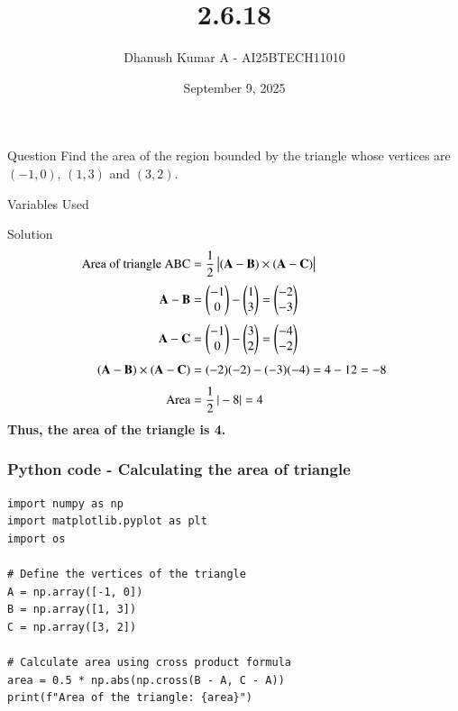 \documentclass{beamer}
\title{2.6.18}
\author{Dhanush Kumar A - AI25BTECH11010}
\date{September 9, 2025}
\begin{document}
\frame{\titlepage}

\begin{frame}{Question}
Find the area of the region bounded by the triangle whose vertices are $(-1, 0)$, $(1, 3)$ and $(3, 2)$.
\end{frame}

\begin{frame}{Variables Used}
\begin{table}[H]    
  \centering
  \caption{Variables Used}
  \label{tab:variables}
\end{table}
\end{frame}




\begin{frame}{Solution}
\begin{align}
\text{Area of triangle ABC} &= \frac{1}{2} \, \big| (\mathbf{A}-\mathbf{B}) \times (\mathbf{A}-\mathbf{C}) \big| \\[1mm]
\mathbf{A}-\mathbf{B} &= \begin{pmatrix}-1 \\ 0\end{pmatrix} - \begin{pmatrix}1 \\ 3\end{pmatrix} = \begin{pmatrix}-2 \\ -3\end{pmatrix} \\[1mm]
\mathbf{A}-\mathbf{C} &= \begin{pmatrix}-1 \\ 0\end{pmatrix} - \begin{pmatrix}3 \\ 2\end{pmatrix} = \begin{pmatrix}-4 \\ -2\end{pmatrix} \\[1mm]
(\mathbf{A}-\mathbf{B}) \times (\mathbf{A}-\mathbf{C}) &= (-2)(-2) - (-3)(-4) = 4 - 12 = -8 \\[1mm]
\text{Area} &= \frac{1}{2} \, | -8 | = 4
\end{align}
\noindent\textbf{Thus, the area of the triangle is 4.}
\end{frame}

\begin{frame}[fragile]                            
\frametitle{Python code - Calculating the area of triangle}                
\begin{lstlisting}
import numpy as np
import matplotlib.pyplot as plt
import os

# Define the vertices of the triangle
A = np.array([-1, 0])
B = np.array([1, 3])
C = np.array([3, 2])

# Calculate area using cross product formula
area = 0.5 * np.abs(np.cross(B - A, C - A))
print(f"Area of the triangle: {area}")
\end{lstlisting}
\end{frame}
\end{document}
